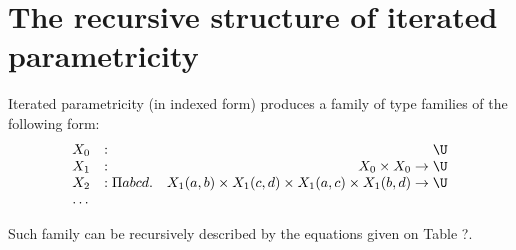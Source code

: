 \documentclass{msc}
\begin{document}
\section{The recursive structure of iterated parametricity}
Iterated parametricity (in indexed form) produces a family of type
families of the following form:
\begin{equation*}
  \begin{array}{llr}
    X_0 & :              & \U                                                                        \\
    X_1 & :              & X_0 \times X_0 \rightarrow  \U                                            \\
    X_2 & : \Pi a b c d. & X_1(a,b) \times X_1 (c,d) \times X_1(a,c) \times X_1 (b,d) \rightarrow \U \\
    \ldots
  \end{array}
\end{equation*}

Such family can be recursively described by the equations given on Table ?.
\end{document}
